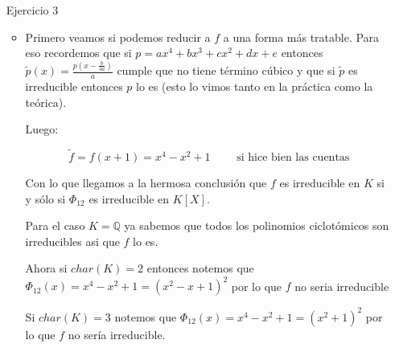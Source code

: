 \documentclass[11pt]{article}
\newcommand{\Q}{\mathbb{Q}}
\numberwithin{theorem}{subsection}
\begin{document}
\begin{enumerate}
	\item[Ejercicio 3] 
	
	\begin{itemize}
		\item Primero veamos si podemos reducir a $f$ a una forma m\'as tratable. Para eso recordemos que si $p = ax^4  + bx^3 + cx^2 + dx + e$ entonces $\widetilde{p}(x) = \frac{p(x- \frac{b}{4a})}{a}$ cumple que no tiene t\'ermino c\'ubico y que si $\widetilde{p}$ es irreducible entonces $p$ lo es (esto lo vimos tanto en la pr\'actica como la te\'orica).
		
		Luego:
		
		\begin{equation*}
			\widetilde{f} = f\left(x +1\right) = x^4 - x^2 + 1 \qquad \text{ si hice bien las cuentas}
		\end{equation*}
		
		Con lo que llegamos a la hermosa conclusi\'on que $f$ es irreducible en $K$ si y s\'olo si $\Phi_{12}$ es irreducible en $K[X]$.
		
		Para el caso $K= \Q$ ya sabemos que todos los polinomios ciclot\'omicos son irreducibles asi que $f$ lo es.
		
		Ahora si $char(K) =2$ entonces notemos que $\Phi_{12} (x) = x^4 - x^2 + 1 = \left(x^2 - x + 1\right)^2$ por lo que $f$ no seria irreducible
		
		Si $char(K) = 3$ notemos que $\Phi_{12} (x) = x^4 - x^2 + 1 = \left(x^2 + 1\right)^2$ por lo que $f$ no ser\'ia irreducible.
		

\end{itemize}
\end{enumerate}
\end{document}
